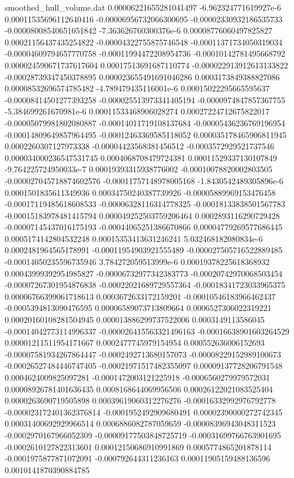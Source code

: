 \begin{filecontents}{smoothed_hull_volume.dat}
0.00006221655281041497	-6.962324771619927e-6	0.00011535696112640416	-0.00006956732066300695	-0.00002330932186535733	-0.00008008540651051842	-7.363626760300376e-6	0.00008776060497825827	0.00021156437435254822	-0.00004322755875746548	-0.00011371734050319034	-0.00004609794657770758	-0.00011994472208954736	-0.00010142781495668792	0.000024590671737617604	0.00017513691687110774	-0.000022913912613133822	-0.00028739347450378895	0.000023655491691046286	0.0003173849388827086
0.00008532696574785482	-4.789479435116001e-6	0.00015022295665595637	-0.00008414501277393258	-0.000025513973341405194	-0.0000974847857367755	-5.384699261670981e-6	0.00011533468906028274	0.00027224712675822017	-0.00005079981802080887	-0.00014011719108137684	-0.00005436236769196954	-0.00014809649857964495	-0.00012463369585118052	0.000035178465906811945	0.0002260307127973338	-0.00004423568381456512	-0.0003572929521737546	0.000034000236547531745	0.0004068708479724381
0.00011529337130107849	-9.764225724950033e-7	0.00019393315938776002	-0.00010078820002803505	-0.000027045718874602576	-0.00011757148978005168	-1.8430542489305896e-6	0.0001501835611349936	0.00034750240387739926	-0.00005889969153476458	-0.00017119485618608533	-0.00006328116314778325	-0.00018133838501567783	-0.00015183978481415794	0.000049252503759206464	0.0002893116290729428	-0.00007145437016175193	-0.00044065251386670866	0.00004779269577686445	0.0005174142804532248
0.00015353413631246241	5.032468182080834e-6	0.0002481964565178991	-0.00011954903921555489	-0.000027505716522889485	-0.00014050235596735946	3.784272059513999e-6	0.00019378225618368932	0.00043999392954985827	-0.00006732977342383773	-0.00020742970068503454	-0.00007267301954876838	-0.00022021689729557364	-0.00018341723033965375	0.00006766399061718613	0.0003672633172159201	-0.00010546183966462437	-0.0005394813090476595	0.00006589073713809664	0.0006527306022319221
0.00020160108281504945	0.000013886299737522006	0.0003149113586045	-0.00014042773114996337	-0.000026415563321496163	-0.00016638901603264529	0.00001211511954171667	0.0002477745979154954	0.000552636006152693	-0.00007581934267864447	-0.0002492713680157073	-0.00008229152989100673	-0.00026527484446747405	-0.00021971517482355097	0.00009137728206791548	0.0004624009825097281	-0.0001472003121225918	-0.0006560279979572031	0.00008926781401636435	0.0008168644069956506
0.00026122021083525404	0.0000263690719505898	0.00039619060312276276	-0.00016332992976792778	-0.000023172401362376814	-0.0001952492909680491	0.00002390000272742345	0.00031400692929966514	0.0006886082787059659	-0.00008396943048311523	-0.0002970167966052309	-0.00009177503848725719	-0.00031699766763901695	-0.0002610127822313601	0.00012150686910991869	0.0005774865201878114	-0.0001975877871072091	-0.000792644311236163	0.00011905159488136596	0.0010141870390884785

\end{filecontents}
